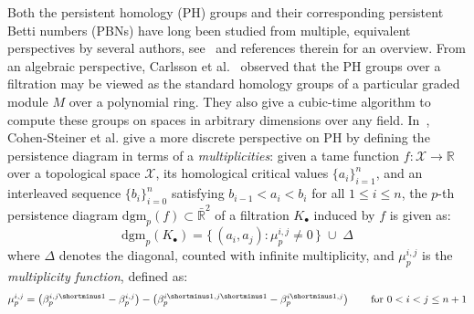 \newcommand\restr[2]{{%
  \left.\kern-\nulldelimiterspace %
  #1 %
  \vphantom{\big|} %
  \right|_{#2} %
  }}
  

Both the persistent homology (PH) groups and their corresponding persistent Betti numbers (PBNs) have long been studied from multiple, equivalent perspectives by several authors, see~\cite{cerri2013betti, chazal2016structure, cohen2005stability, zomorodian2004computing} and references therein for an overview. 
From an algebraic perspective, Carlsson et al.~\cite{zomorodian2004computing} observed that the PH groups over a filtration may be viewed as the standard homology groups of a particular graded module $M$ over a polynomial ring. They also give a cubic-time algorithm to compute these groups on spaces in arbitrary dimensions over any field. 
In~\cite{cohen2005stability}, Cohen-Steiner et al. give a more discrete perspective on PH by defining the persistence diagram in terms of a \emph{multiplicities}: given a tame function $f: \mathcal{X} \to \mathbb{R}$ over a topological space $\mathcal{X}$, its homological critical values $\{ a_i \}_{i=1}^n$, and an interleaved sequence $\{ b_i \}_{i=0}^n$ satisfying $b_{i-1} < a_i < b_i$ for all $1 \leq i \leq n$, the $p$-th persistence diagram $\mathrm{dgm}_p(f) \subset \bar{\mathbb{R}}^2$ of a filtration $K_\bullet$ induced by $f$ is given as: 
\begin{equation}
\mathrm{dgm}_p(K_\bullet) = \{ \, (a_i, a_j) :  \mu_p^{i,j} \neq 0 \, \} \; \cup \; \Delta	
\end{equation}
where $\Delta$ denotes the diagonal, counted with infinite multiplicity, and $\mu_p^{i,j}$ is the  \emph{multiplicity function}, defined as: 
\begin{equation}\label{eq:multiplicity}
	\mu_p^{i,j} = \left(\beta_p^{i,j\shortminus1} - \beta_p^{i,j} \right) - \left(\beta_p^{i\shortminus1,j\shortminus1} - \beta_p^{i\shortminus1,j} \right) \quad\quad \text{for } 0 < i < j \leq n+ 1
\end{equation}
